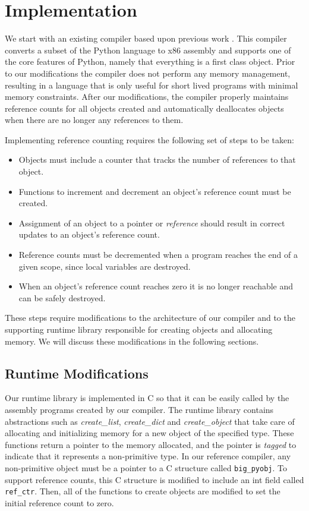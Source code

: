 \documentclass{sigplanconf}
\newcommand{\afunction}[1]{\textit{#1}}
\newcommand{\atype}[1]{\texttt{#1}}
\newcommand{\afield}[1]{\texttt{#1}}
\begin{document}
\section{Implementation}
\label{sec:implementation}

We start with an existing compiler based upon previous work \cite{siek}.  This compiler converts a subset of the Python language to x86 assembly and supports one of the core features of Python, namely that everything is a first class object.  Prior to our modifications the compiler does not perform any memory management, resulting in a language that is only useful for short lived programs with minimal memory constraints.  After our modifications, the compiler properly maintains reference counts for all objects created and automatically deallocates objects when there are no longer any references to them.

Implementing reference counting requires the following set of steps to be taken:

\begin{itemize}
\item Objects must include a counter that tracks the number of references to that object.
\item Functions to increment and decrement an object's reference count must be created.
\item Assignment of an object to a pointer or \textit{reference} should result in correct updates to an object's reference count.
\item Reference counts must be decremented when a program reaches the end of a given scope, since local variables are destroyed.
\item When an object's reference count reaches zero it is no longer reachable and can be safely destroyed.

\end{itemize}

These steps require modifications to the architecture of our compiler and to the supporting runtime library responsible for creating objects and allocating memory.  We will discuss these modifications in the following sections.

\subsection{Runtime Modifications}
Our runtime library is implemented in C so that it can be easily called by the assembly programs created by our compiler.  The runtime library contains abstractions such as \afunction{create\_list}, \afunction{create\_dict} and \afunction{create\_object} that take care of allocating and initializing memory for a new object of the specified type.  These functions return a pointer to the memory allocated, and the pointer is \textit{tagged} to indicate that it represents a non-primitive type.  In our reference compiler, any non-primitive object must be a pointer to a C structure called \atype{big\_pyobj}.  To support reference counts, this C structure is modified to include an int field called \afield{ref\_ctr}.  Then, all of the functions to create objects are modified to set the initial reference count to zero.
\end{document}
